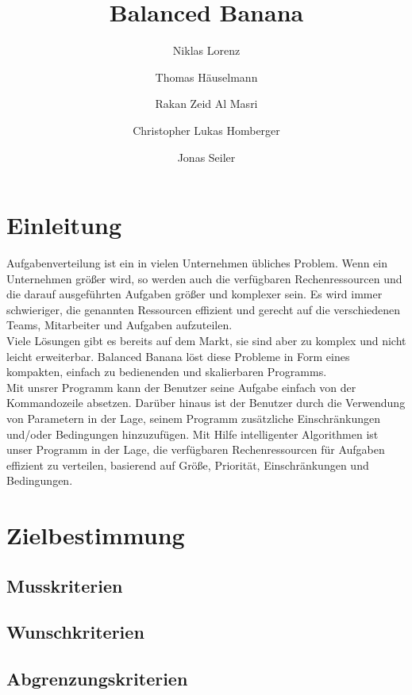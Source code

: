 \documentclass[a4paper,12pt]{article}
\title{Balanced Banana}
\author{Niklas Lorenz \and Thomas Häuselmann \and Rakan Zeid Al Masri \and Christopher Lukas Homberger \and Jonas Seiler}
\begin{document}
\setcounter{page}{2}
\tableofcontents          %
\clearpage
{}

\section{Einleitung}
\vspace*{1cm}

Aufgabenverteilung ist ein in vielen Unternehmen übliches Problem. Wenn ein Unternehmen größer wird, 
so werden auch die verfügbaren Rechenressourcen und die darauf ausgeführten Aufgaben größer und komplexer sein. Es wird immer schwieriger, die genannten Ressourcen effizient und gerecht auf die verschiedenen Teams, Mitarbeiter und Aufgaben aufzuteilen. \\

Viele Lösungen gibt es bereits auf dem Markt, sie sind aber zu komplex und nicht leicht erweiterbar. Balanced Banana löst diese Probleme in Form eines kompakten, einfach zu bedienenden und skalierbaren Programms. \\

Mit unsrer Programm kann der Benutzer seine Aufgabe einfach von der Kommandozeile absetzen. Darüber hinaus ist der Benutzer durch die Verwendung von Parametern in der Lage, seinem Programm zusätzliche Einschränkungen und/oder Bedingungen hinzuzufügen. Mit Hilfe intelligenter Algorithmen ist unser Programm in der Lage, die verfügbaren Rechenressourcen für Aufgaben effizient zu verteilen, basierend auf Größe, Priorität, Einschränkungen und Bedingungen.

\section{Zielbestimmung}
\subsection{Musskriterien}
\subsection{Wunschkriterien}
\subsection{Abgrenzungskriterien}
\end{document}
